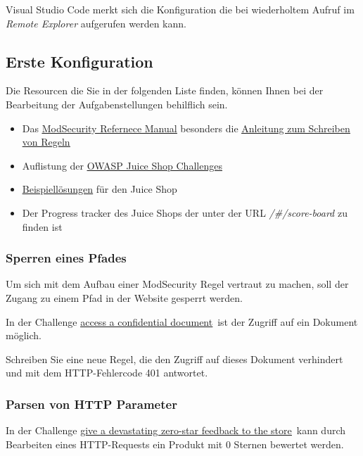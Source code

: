 Visual Studio Code merkt sich die Konfiguration die bei wiederholtem Aufruf im \textit{Remote Explorer} aufgerufen werden kann.

\subsection{Erste Konfiguration}

Die Resourcen die Sie in der folgenden Liste finden, können Ihnen bei der Bearbeitung der Aufgabenstellungen behilflich sein.

\begin{itemize}
    \item Das \href{https://github.com/owasp-modsecurity/ModSecurity/wiki/Reference-Manual-(v3.x)}{\underline{ModSecurity Refernece Manual}} besonders die  \href{https://coreruleset.org/docs/rules/creating/}{\underline{Anleitung zum Schreiben von Regeln}}
    \item Auflistung der \href{https://pwning.owasp-juice.shop/companion-guide/latest/part2/README.html}{\underline{OWASP Juice Shop Challenges}}
    \item \href{https://github.com/refabr1k/owasp-juiceshop-solutions/tree/master}{\underline{Beispiellösungen}} für den Juice Shop
    \item Der Progress tracker des Juice Shops der unter der URL \textit{/\#/score-board} zu finden ist
\end{itemize}

\subsubsection{Sperren eines Pfades}
Um sich mit dem Aufbau einer ModSecurity Regel vertraut zu machen, soll der Zugang zu einem Pfad in der Website gesperrt werden.

In der Challenge \glqq\href{https://pwning.owasp-juice.shop/companion-guide/latest/part2/sensitive-data-exposure.html#_access_a_confidential_document}{\underline{access a confidential document}}\grqq\ ist der Zugriff auf ein Dokument möglich.

Schreiben Sie eine neue Regel, die den Zugriff auf dieses Dokument verhindert und mit dem HTTP-Fehlercode 401 antwortet.

\subsubsection{Parsen von HTTP Parameter}
In der Challenge \glqq\href{https://pwning.owasp-juice.shop/companion-guide/latest/part2/improper-input-validation.html#_give_a_devastating_zero_star_feedback_to_the_store}{\underline{give a devastating zero-star feedback to the store}}\grqq\ kann durch Bearbeiten eines HTTP-Requests ein Produkt mit 0 Sternen bewertet werden.

